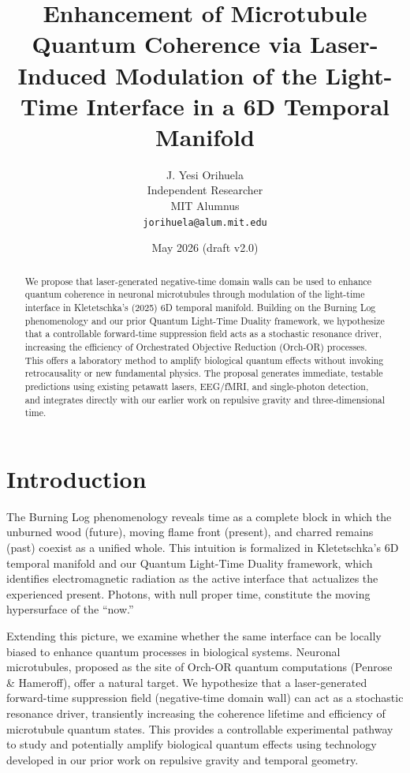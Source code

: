 \documentclass[11pt,a4paper]{article}
\begin{document}
\title{\textbf{Enhancement of Microtubule Quantum Coherence via Laser-Induced Modulation of the Light-Time Interface in a 6D Temporal Manifold}}

\author{J. Yesi Orihuela \\
\small Independent Researcher \\
\small MIT Alumnus \\
\small \texttt{jorihuela@alum.mit.edu}}

\date{May 2026 (draft v2.0)}

\maketitle

\begin{abstract}
We propose that laser-generated negative-time domain walls can be used to enhance quantum coherence in neuronal microtubules through modulation of the light-time interface in Kletetschka’s (2025) 6D temporal manifold. Building on the Burning Log phenomenology and our prior Quantum Light-Time Duality framework, we hypothesize that a controllable forward-time suppression field acts as a stochastic resonance driver, increasing the efficiency of Orchestrated Objective Reduction (Orch-OR) processes. This offers a laboratory method to amplify biological quantum effects without invoking retrocausality or new fundamental physics. The proposal generates immediate, testable predictions using existing petawatt lasers, EEG/fMRI, and single-photon detection, and integrates directly with our earlier work on repulsive gravity and three-dimensional time.
\end{abstract}

\section{Introduction}

The Burning Log phenomenology reveals time as a complete block in which the unburned wood (future), moving flame front (present), and charred remains (past) coexist as a unified whole. This intuition is formalized in Kletetschka’s 6D temporal manifold and our Quantum Light-Time Duality framework, which identifies electromagnetic radiation as the active interface that actualizes the experienced present. Photons, with null proper time, constitute the moving hypersurface of the ``now.''

Extending this picture, we examine whether the same interface can be locally biased to enhance quantum processes in biological systems. Neuronal microtubules, proposed as the site of Orch-OR quantum computations (Penrose \& Hameroff), offer a natural target. We hypothesize that a laser-generated forward-time suppression field (negative-time domain wall) can act as a stochastic resonance driver, transiently increasing the coherence lifetime and efficiency of microtubule quantum states. This provides a controllable experimental pathway to study and potentially amplify biological quantum effects using technology developed in our prior work on repulsive gravity and temporal geometry.
\end{document}
